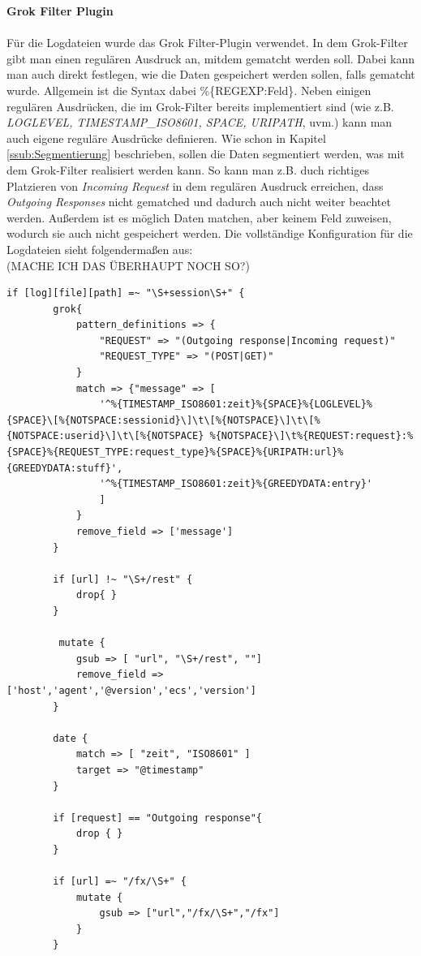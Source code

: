 \textbf{Grok Filter Plugin}\\
\\
Für die Logdateien wurde das Grok Filter-Plugin verwendet. In dem Grok-Filter gibt man einen regulären Ausdruck an, mitdem gematcht werden soll. Dabei kann man auch direkt festlegen, wie die Daten gespeichert werden sollen, falls gematcht wurde. Allgemein ist die Syntax dabei \%\{REGEXP:Feld\}. Neben einigen regulären Ausdrücken, die im Grok-Filter bereits implementiert sind (wie z.B. \textit{LOGLEVEL, TIMESTAMP\_ISO8601, SPACE, URIPATH}, uvm.) kann man auch eigene reguläre Ausdrücke definieren.
Wie schon in Kapitel \ref{ssub:Segmentierung} beschrieben, sollen die Daten segmentiert werden, was mit dem Grok-Filter realisiert werden kann. So kann man z.B. duch richtiges Platzieren von \textit{Incoming Request} in dem regulären Ausdruck erreichen, dass \textit{Outgoing Responses} nicht gematched und dadurch auch nicht weiter beachtet werden. Außerdem ist es möglich Daten matchen, aber keinem Feld zuweisen, wodurch sie auch nicht gespeichert werden. 
Die vollständige Konfiguration für die Logdateien sieht folgendermaßen aus:\\ (MACHE ICH DAS ÜBERHAUPT NOCH SO?)
\newpage
\begin{lstlisting}[caption = Sessionlog Filter,captionpos=b]
if [log][file][path] =~ "\S+session\S+" {
        grok{
            pattern_definitions => {
                "REQUEST" => "(Outgoing response|Incoming request)"
                "REQUEST_TYPE" => "(POST|GET)"
            }
            match => {"message" => [
                '^%{TIMESTAMP_ISO8601:zeit}%{SPACE}%{LOGLEVEL}%{SPACE}\[%{NOTSPACE:sessionid}\]\t\[%{NOTSPACE}\]\t\[%{NOTSPACE:userid}\]\t\[%{NOTSPACE} %{NOTSPACE}\]\t%{REQUEST:request}:%{SPACE}%{REQUEST_TYPE:request_type}%{SPACE}%{URIPATH:url}%{GREEDYDATA:stuff}',
                '^%{TIMESTAMP_ISO8601:zeit}%{GREEDYDATA:entry}'
                ]
            }
            remove_field => ['message']
        }

        if [url] !~ "\S+/rest" {
            drop{ }
        }

         mutate {
            gsub => [ "url", "\S+/rest", ""]
            remove_field => ['host','agent','@version','ecs','version']
        }

        date {
            match => [ "zeit", "ISO8601" ]
            target => "@timestamp"
		}

        if [request] == "Outgoing response"{
            drop { }
        }

        if [url] =~ "/fx/\S+" {
            mutate {
                gsub => ["url","/fx/\S+","/fx"]
            }
        }
\end{lstlisting}
\newpage
\label{lst:logEntryFilter}

